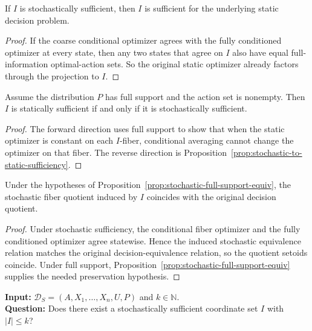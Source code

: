 \begin{proposition}\label{prop:stochastic-to-static-sufficiency}
If $I$ is stochastically sufficient, then $I$ is sufficient for the underlying static decision problem.
\end{proposition}


\begin{proof}
If the coarse conditional optimizer agrees with the fully conditioned optimizer at every state, then any two states that agree on $I$ also have equal full-information optimal-action sets. So the original static optimizer already factors through the projection to $I$.
\end{proof}

\begin{proposition}\label{prop:stochastic-full-support-equiv}
Assume the distribution $P$ has full support and the action set is nonempty. Then $I$ is statically sufficient if and only if it is stochastically sufficient.
\end{proposition}


\begin{proof}
The forward direction uses full support to show that when the static optimizer is constant on each $I$-fiber, conditional averaging cannot change the optimizer on that fiber. The reverse direction is Proposition~\ref{prop:stochastic-to-static-sufficiency}.
\end{proof}

\begin{proposition}\label{prop:stochastic-quotient-equiv}
Under the hypotheses of Proposition~\ref{prop:stochastic-full-support-equiv}, the stochastic fiber quotient induced by $I$ coincides with the original decision quotient.
\end{proposition}


\begin{proof}
Under stochastic sufficiency, the conditional fiber optimizer and the fully conditioned optimizer agree statewise. Hence the induced stochastic equivalence relation matches the original decision-equivalence relation, so the quotient setoids coincide. Under full support, Proposition~\ref{prop:stochastic-full-support-equiv} supplies the needed preservation hypothesis.
\end{proof}

\begin{problem}\label{prob:stochastic-minimum-preservation}
\textbf{Input:} $\mathcal{D}_S=(A,X_1,\ldots,X_n,U,P)$ and $k\in\mathbb{N}$. \\
\textbf{Question:} Does there exist a stochastically sufficient coordinate set $I$ with $|I|\le k$?
\end{problem}

